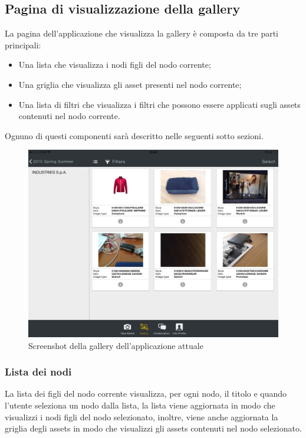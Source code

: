 \subsection{Pagina di visualizzazione della gallery}

La pagina dell'applicazione che visualizza la gallery è composta da tre parti principali:
\begin{itemize}
\item Una lista che visualizza i nodi figli del nodo corrente;
\item Una griglia che visualizza gli asset presenti nel nodo corrente;
\item Una lista di filtri che visualizza i filtri che possono essere applicati sugli assets contenuti nel nodo corrente.
\end{itemize}
Ognuno di questi componenti sarà descritto nelle seguenti sotto sezioni.

\begin{figure}[htp]
\centering
\includegraphics[width=\textwidth]{../immagini/warda-gallery}
\caption{Screenshot della gallery dell'applicazione attuale}  
\end{figure}

\subsubsection{Lista dei nodi}


La lista dei figli del nodo corrente visualizza, per ogni nodo, il titolo e quando l'utente seleziona un nodo dalla lista, la lista viene aggiornata in modo che visualizzi i nodi figli del nodo selezionato, inoltre, viene anche aggiornata la griglia degli assets in modo che visualizzi gli assets contenuti nel nodo selezionato.

